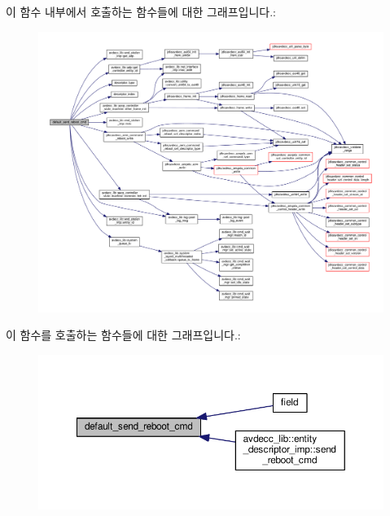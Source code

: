 이 함수 내부에서 호출하는 함수들에 대한 그래프입니다.\+:
\nopagebreak
\begin{figure}[H]
\begin{center}
\leavevmode
\includegraphics[width=350pt]{classavdecc__lib_1_1descriptor__base__imp_a14e3bd11c70e839a0594dc59dffcbf16_cgraph}
\end{center}
\end{figure}




이 함수를 호출하는 함수들에 대한 그래프입니다.\+:
\nopagebreak
\begin{figure}[H]
\begin{center}
\leavevmode
\includegraphics[width=350pt]{classavdecc__lib_1_1descriptor__base__imp_a14e3bd11c70e839a0594dc59dffcbf16_icgraph}
\end{center}
\end{figure}


